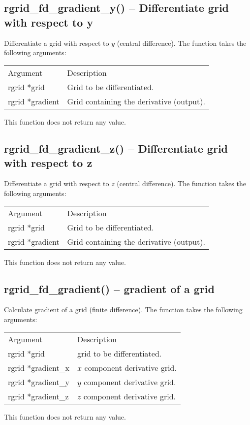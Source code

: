 \documentclass[12pt,letterpaper]{report}
\begin{document}
\subsection{rgrid\_fd\_gradient\_y() -- Differentiate grid with respect to y}

Differentiate a grid with respect to $y$ (central difference). The function takes the following arguments:
\begin{longtable}{p{} p{}}
Argument & Description\\
\cline{1-2}
rgrid *grid & Grid to be differentiated.\\
rgrid *gradient & Grid containing the derivative (output).\\
\end{longtable}
\noindent
This function does not return any value.

\subsection{rgrid\_fd\_gradient\_z() -- Differentiate grid with respect to z}

Differentiate a grid with respect to $z$ (central difference). The function takes the following arguments:
\begin{longtable}{p{} p{}}
Argument & Description\\
\cline{1-2}
rgrid *grid & Grid to be differentiated.\\
rgrid *gradient & Grid containing the derivative (output).\\
\end{longtable}
\noindent
This function does not return any value.

\subsection{rgrid\_fd\_gradient() -- gradient of a grid}

Calculate gradient of a grid (finite difference). The function takes the following arguments:
\begin{longtable}{p{} p{}}
Argument & Description\\
\cline{1-2}
rgrid *grid & grid to be differentiated.\\
rgrid *gradient\_x & $x$ component derivative grid.\\
rgrid *gradient\_y & $y$ component derivative grid.\\
rgrid *gradient\_z & $z$ component derivative grid.\\
\end{longtable}
\noindent
This function does not return any value.
\end{document}
